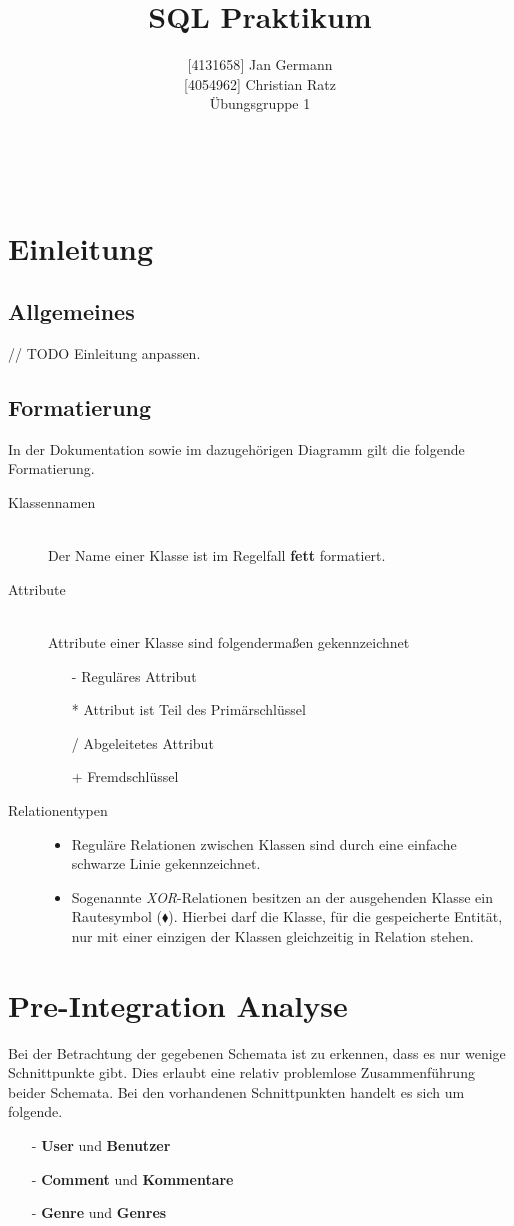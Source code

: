 \documentclass[11pt,a4paper,DIV=9]{scrartcl}
\author{{[}4131658{]} Jan Germann \\{[}4054962{]} Christian Ratz\\Übungsgruppe 1}
\title{SQL Praktikum}
\renewcommand{\author}[1]{\renewcommand{\author}{#1}}
\renewcommand{\title}[1]{\renewcommand{\title}{#1}}
\newcommand{\makehomeworktitle}{
  \begin{minipage}[t]{6.5cm}
    \sf{\author}
  \end{minipage}
  \begin{minipage}[t]{6.5cm}
    \begin{flushright}
      \sf{\title\\\today}
    \end{flushright}
  \end{minipage}
  \\[0.2cm]
  \begin{center}
    \sf{
      \color{blue}{
        \LARGE{Dokumentation First.FM}
      }
    }
  \end{center}
  \vspace{0.1cm}
}
\begin{document}
\makehomeworktitle
\tableofcontents
\newpage
\section{Einleitung}
  \subsection{Allgemeines}
    // TODO Einleitung anpassen.

  \subsection{Formatierung} 
    In der Dokumentation sowie im dazugehörigen Diagramm gilt die folgende Formatierung.

    \begin{description}
      \item [Klassennamen] \hfill \\
        Der Name einer Klasse ist im Regelfall \textbf{fett} formatiert.
      \item [Attribute] \hfill \\
        Attribute einer Klasse sind folgendermaßen gekennzeichnet
        \begin{itemize}
          \item[-] Reguläres Attribut
          \item[*] Attribut ist Teil des Primärschlüssel
          \item[/] Abgeleitetes Attribut
          \item[+] Fremdschlüssel
        \end{itemize}
      \item[Relationentypen] \hfill
      \begin{itemize}
        \item Reguläre Relationen zwischen Klassen sind durch eine einfache schwarze Linie gekennzeichnet.
        \item Sogenannte \textit{XOR}-Relationen besitzen an der ausgehenden Klasse ein Rautesymbol ($\blacklozenge$). Hierbei darf die Klasse, für die gespeicherte Entität, nur mit einer einzigen der Klassen gleichzeitig in Relation stehen.
      \end{itemize}
    \end{description}


\section{Pre-Integration Analyse}
  Bei der Betrachtung der gegebenen Schemata ist zu erkennen, dass es nur wenige Schnittpunkte gibt. Dies erlaubt eine relativ problemlose Zusammenführung beider Schemata.
  Bei den vorhandenen Schnittpunkten handelt es sich um folgende.
  \begin{itemize}
    \item[-] \textbf{User} und \textbf{Benutzer}
    \item[-] \textbf{Comment} und \textbf{Kommentare}
    \item[-] \textbf{Genre} und \textbf{Genres}
  \end{itemize}
\end{document}
